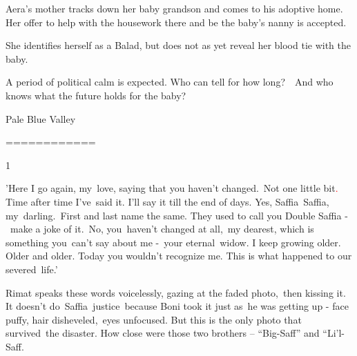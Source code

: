 \documentclass[letterpaper]{article}
\begin{document}
\textcolor[rgb]{0.13333334,0.13333334,0.13333334}{Aera's mother tracks down her baby grandson and comes to his adoptive
home. Her offer to help with the housework there and be the baby's nanny is accepted. }


\bigskip

\textcolor[rgb]{0.13333334,0.13333334,0.13333334}{She identifies herself as a Balad, but does not as yet reveal her
blood tie with the baby.}

\textcolor[rgb]{0.13333334,0.13333334,0.13333334}{A period of political calm is expected. Who can tell for how
long?\ \ And who knows what the future holds for the baby?}


\bigskip

\clearpage
\bigskip

Pale Blue Valley

============


\bigskip


\bigskip

\textcolor[rgb]{0.13333334,0.13333334,0.13333334}{1}

\textcolor[rgb]{0.13333334,0.13333334,0.13333334}{{}'Here I go }again,
my\ love,\textcolor[rgb]{0.13333334,0.13333334,0.13333334}{ saying that you haven't changed.\ Not one little
bit}\textcolor{red}{. }\textcolor[rgb]{0.13333334,0.13333334,0.13333334}{Time after time I've\ said it. I'll say it
till the end of days. Yes, Saffia\ Saffia, my~darling.\ First and last name the same. }They used to call you Double
Saffia -\ make a joke of it.\textcolor[rgb]{0.13333334,0.13333334,0.13333334}{\ No,
you}\textit{\textcolor[rgb]{0.13333334,0.13333334,0.13333334}{\ }}\textcolor[rgb]{0.13333334,0.13333334,0.13333334}{haven't
changed }at all,\ my dearest, which is something you\ \textcolor[rgb]{0.13333334,0.13333334,0.13333334}{can't say about
me -}\ \textcolor[rgb]{0.13333334,0.13333334,0.13333334}{your
}eternal\textcolor[rgb]{0.13333334,0.13333334,0.13333334}{\ widow. I keep growing older. Older and older.
}Today\textcolor[rgb]{0.13333334,0.13333334,0.13333334}{ you wouldn't recognize me. This is what happened to our
severed~life.'}

Rimat speaks these words voicelessly, gazing at the faded photo,\ then kissing it.
It\textcolor[rgb]{0.13333334,0.13333334,0.13333334}{ doesn't
do\ Saffia}\textcolor{red}{\ }\textcolor[rgb]{0.13333334,0.13333334,0.13333334}{justice\ because Boni took it }just
as\ he was getting up - face puffy, hair
disheveled,\textcolor[rgb]{0.0,0.4392157,0.7529412}{\ }\textcolor[rgb]{0.13333334,0.13333334,0.13333334}{eyes
unfocused. But this is the only photo that survived\ }the disaster\textcolor[rgb]{0.13333334,0.13333334,0.13333334}{.
How close were those two brothers {}-- }{}``Big-Saff{}'' and {}``Li{}'l{}-Saff{\textquotedbl}. 
\end{document}
